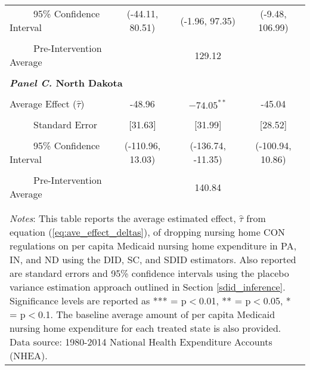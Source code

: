 \documentclass[../Main.tex]{subfiles}
\begin{document}
\begin{table}[htbp]
\begin{tabular}{l*{3}{c}}
\\[-2ex]
\multicolumn{1}{l}{\ \ \ \ \ 95\% Confidence Interval}&   \multicolumn{1}{c}{(-44.11, 80.51)}&   \multicolumn{1}{c}{(-1.96, 97.35)}&   \multicolumn{1}{c}{(-9.48, 106.99)}\\
\\[-2ex]
\multicolumn{1}{l}{\ \ \ \ \ Pre-Intervention Average}&   \multicolumn{3}{c}{129.12}\\
\\[-.1ex]
\multicolumn{4}{l}{\textbf{\textit{Panel C.} North Dakota}}\\
\\[-1.5ex]
\multicolumn{1}{l}{Average Effect ($\hat{\tau}$)}&   \multicolumn{1}{c}{-48.96} &   \multicolumn{1}{c}{$-74.05^{**}$}&  \multicolumn{1}{c}{-45.04}\\
\\[-2ex]
\multicolumn{1}{l}{\ \ \ \ \ Standard Error}  &\multicolumn{1}{c}{[31.63]}&\multicolumn{1}{c}{[31.99]}&\multicolumn{1}{c}{[28.52]}\\
\\[-2ex]
\multicolumn{1}{l}{\ \ \ \ \ 95\% Confidence Interval}&   \multicolumn{1}{c}{(-110.96, 13.03)}&   \multicolumn{1}{c}{(-136.74, -11.35)}&   \multicolumn{1}{c}{(-100.94, 10.86)}\\
\\[-2ex]
\multicolumn{1}{l}{\ \ \ \ \ Pre-Intervention Average}&   \multicolumn{3}{c}{140.84}\\
\\[-.1ex]
\hline\hline
\\[-2ex]
\multicolumn{4}{p{.8\linewidth}}{\footnotesize \textit{Notes}: This table reports the average estimated effect, $\hat{\tau}$ from equation (\ref{eq:ave_effect_deltas}), of dropping nursing home CON regulations on per capita Medicaid nursing home expenditure in PA, IN, and ND using the DID, SC, and SDID estimators. Also reported are standard errors and 95\% confidence intervals using the placebo variance estimation approach outlined in Section \ref{sdid_inference}. Significance levels are reported as *** = p$<$0.01, ** = p$<$0.05, * = p$<$0.1. The baseline average amount of per capita Medicaid nursing home expenditure for each treated state is also provided. Data source: 1980-2014 National Health Expenditure Accounts (NHEA).}
\end{tabular}
\end{table}
\vfill
\clearpage
\end{document}
